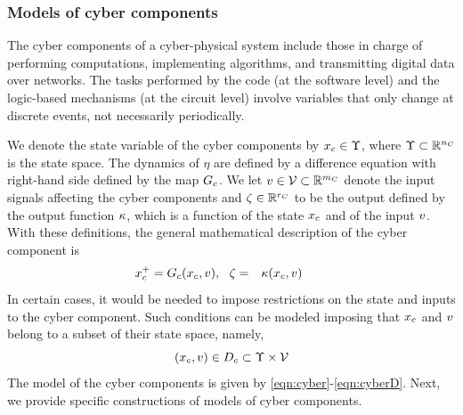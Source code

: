 \documentclass{article}
\begin{document}
\subsubsection{Models of cyber components}
\label{sec:CyberModels}

The cyber components of a cyber-physical system 	
include those in charge of performing computations, 
implementing algorithms, and transmitting digital data over networks.
The tasks performed by the code (at the software level) 
and the logic-based mechanisms (at the circuit level)
involve variables that only change at discrete events, not necessarily periodically.

We denote the state
variable of the cyber components by $x_c \in \Upsilon$, where $\Upsilon \subset {\mathbb R}^{n_C}$ is the state space. 
The dynamics of $\eta$ are defined by a difference equation with
right-hand side defined by the map $G_c$. 
We let $v \in {\cal V} \subset {\mathbb R}^{m_C}$ denote the input signals affecting the cyber components
and $\zeta\in{\mathbb R}^{r_C}$ to be the output defined by
the output function $\kappa$, which is a function of the state $x_c$ and
of the input $v$. With these definitions, the general mathematical
description of the cyber component is
\begin{eqnarray} \label{eqn:cyber}
\xc^+ = \gc(\xc,\uc), \  \ \yc &=& \hc(\xc,\uc) \qquad 
\end{eqnarray}
In certain cases, it would be needed to impose restrictions on the state and inputs to the cyber component. 
Such conditions can be modeled 
imposing that $x_c$ and $v$ belong to a subset of their state space,
namely,
\begin{equation}\label{eqn:cyberD}
(\xc,\uc) \in \Dc \subset \xcSpace \times \ucSpace
\end{equation}
The model of the cyber components 
is given by \eqref{eqn:cyber}-\eqref{eqn:cyberD}.
Next, we provide specific constructions of models of cyber components.
\end{document}
